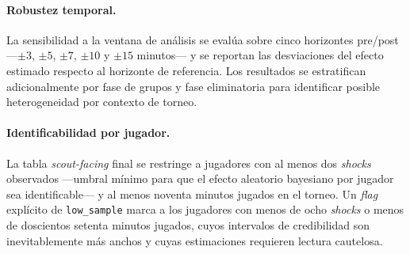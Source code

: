 \paragraph{Robustez temporal.}
La sensibilidad a la ventana de análisis se evalúa sobre cinco
horizontes pre/post ---$\pm 3$, $\pm 5$, $\pm 7$, $\pm 10$ y
$\pm 15$ minutos--- y se reportan las desviaciones del efecto
estimado respecto al horizonte de referencia. Los resultados se
estratifican adicionalmente por fase de grupos y fase eliminatoria
para identificar posible heterogeneidad por contexto de torneo.

\paragraph{Identificabilidad por jugador.}
La tabla \textit{scout-facing} final se restringe a jugadores con al
menos dos \textit{shocks} observados ---umbral mínimo para que el
efecto aleatorio bayesiano por jugador sea identificable--- y al
menos noventa minutos jugados en el torneo. Un \textit{flag} explícito
de \texttt{low\_sample} marca a los jugadores con menos de ocho
\textit{shocks} o menos de doscientos setenta minutos jugados, cuyos
intervalos de credibilidad son inevitablemente más anchos y cuyas
estimaciones requieren lectura cautelosa.
